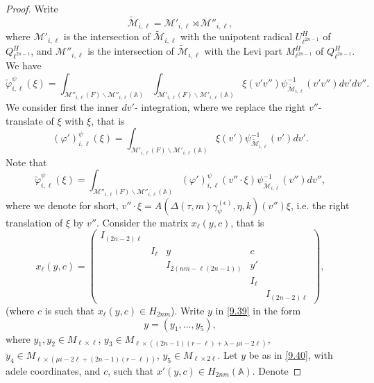 \documentclass[12pts]{amsart}
\newcommand{\BA}{{\mathbb {A}}}
\begin{document}
\begin{proof}
 Write 
 \begin{equation}\label{9.36}
 \tilde{\mathcal{M}}_{i,\ell}=\mathcal{M}'_{i,\ell}\rtimes\mathcal{M}''_{i,\ell},
 \end{equation}
 where $\mathcal{M}'_{i,\ell}$ is the intersection of $\tilde{\mathcal{M}}_{i,\ell}$ with the unipotent radical $U^H_{\ell^{2n-1}}$ of $Q^H_{\ell^{2n-1}}$, and $\mathcal{M}''_{i,\ell}$ is the intersection of $\tilde{\mathcal{M}}_{i,\ell}$ with the Levi part $M^H_{\ell^{2n-1}}$ of $Q^H_{\ell^{2n-1}}$. We have
 \begin{equation}\label{9.37}
 \tilde{\varphi}_{i,\ell}^\psi(\xi)=
 \int_{\mathcal{M}''_{i,\ell}(F)\backslash
 	\mathcal{M}''_{i,\ell}(\BA)}\int_{\mathcal{M}'_{i,\ell}(F)\backslash
 	\mathcal{M}'_{i,\ell}(\BA)}\xi(v'v'')\psi^{-1}_{\tilde{\mathcal{M}}_{i,\ell}}(v'v'')dv'dv''. 
 \end{equation}
 We consider first the inner $dv'$- integration, where we replace the right $v''$- translate of $\xi$ with $\xi$, that is
 \begin{equation}\label{9.38}
 (\varphi')_{i,\ell}^\psi(\xi)=
 \int_{\mathcal{M}'_{i,\ell}(F)\backslash
 	\mathcal{M}'_{i,\ell}(\BA)}\xi(v')\psi^{-1}_{\tilde{\mathcal{M}}_{i,\ell}}(v')dv'. 
 \end{equation}
 Note that
 \begin{equation}\label{9.37.1}
 \tilde{\varphi}_{i,\ell}^\psi(\xi)=
 \int_{\mathcal{M}''_{i,\ell}(F)\backslash
 	\mathcal{M}''_{i,\ell}(\BA)}(\varphi')_{i,\ell}^\psi(v''\cdot \xi)\psi^{-1}_{\tilde{\mathcal{M}}_{i,\ell}}(v'')dv'',
 \end{equation}
 where we denote for short, $v''\cdot\xi= A(\Delta(\tau,m)\gamma_\psi^{(\epsilon)},\eta,k)(v'')\xi$, i.e. the right translation of $\xi$ by $v''$.  Consider the matrix $x_\ell(y,c)$, that is
 \begin{equation}\label{9.39}
 x_\ell(y,c)=\begin{pmatrix}I_{(2n-2)\ell}\\&I_\ell&y&c\\&&I_{2(nm-\ell(2n-1))}&y'\\&&&I_\ell\\&&&&I_{(2n-2)\ell}\end{pmatrix},
 \end{equation}
 (where $c$ is such that $x_\ell(y,c)\in H_{2nm}$). Write $y$ in \eqref{9.39} in the form
 \begin{equation}\label{9.40}
 y=(y_1,...,y_5),
 \end{equation}
 where $y_1,y_2\in M_{\ell\times\ell}$, $y_3\in M_{\ell\times ((2n-1)(r-\ell)+\lambda-\mu i-2\ell)}$, $y_4\in M_{\ell\times (\mu i-2\ell+(2n-1)(r-\ell))}$, $y_5\in M_{\ell\times 2\ell}$. Let $y$ be as in \eqref{9.40}, with adele coordinates, and $c$, such that $x'(y,c)\in H_{2nm}(\BA)$. Denote

\end{proof}
\end{document}
